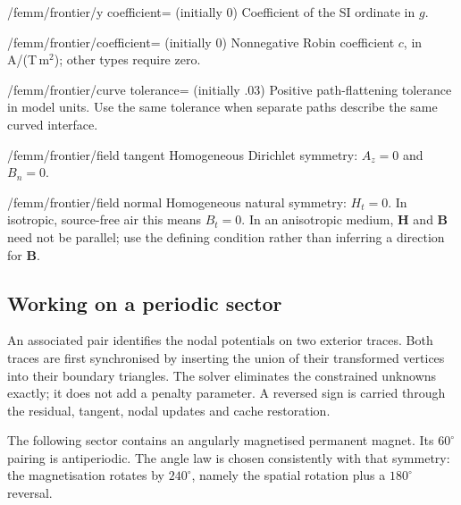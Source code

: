 \begin{key}{/femm/frontier/y coefficient= (initially 0)}
Coefficient of the SI ordinate in $g$.
\end{key}
\begin{key}{/femm/frontier/coefficient= (initially 0)}
Nonnegative Robin coefficient $c$, in A/(T\,m$^2$); other types require zero.
\end{key}
\begin{key}{/femm/frontier/curve tolerance= (initially .03)}
Positive path-flattening tolerance in model units. Use the same tolerance when
separate paths describe the same curved interface.
\end{key}
\begin{stylekey}{/femm/frontier/field tangent}
Homogeneous Dirichlet symmetry: $A_z=0$ and $B_n=0$.
\end{stylekey}
\begin{stylekey}{/femm/frontier/field normal}
Homogeneous natural symmetry: $H_t=0$. In isotropic, source-free air this means
$B_t=0$. In an anisotropic medium, $\mathbf H$ and $\mathbf B$ need not be parallel;
use the defining condition rather than inferring a direction for $\mathbf B$.
\end{stylekey}

\subsection{Working on a periodic sector}
An associated pair identifies the nodal potentials on two exterior traces.
Both traces are first synchronised by inserting the union of their transformed
vertices into their boundary triangles. The solver eliminates the constrained
unknowns exactly; it does not add a penalty parameter. A reversed sign is carried
through the residual, tangent, nodal updates and cache restoration.

The following sector contains an angularly magnetised permanent magnet. Its
$60^\circ$ pairing is antiperiodic. The angle law is chosen consistently with
that symmetry: the magnetisation rotates by $240^\circ$, namely the spatial
rotation plus a $180^\circ$ reversal.


\begin{codeexample}
\end{codeexample}

